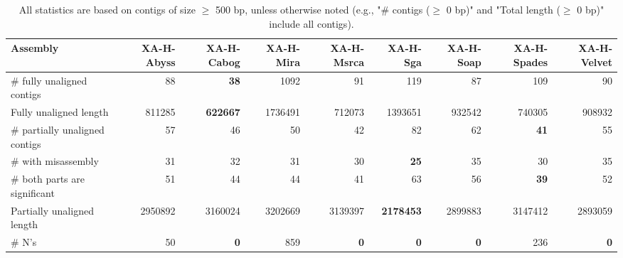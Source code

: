 \documentclass[12pt,a4paper]{article}
\begin{document}
\begin{table}[ht]
\begin{center}
\caption{All statistics are based on contigs of size $\geq$ 500 bp, unless otherwise noted (e.g., "\# contigs ($\geq$ 0 bp)" and "Total length ($\geq$ 0 bp)" include all contigs).}
\begin{tabular}{|l*{8}{|r}|}
\hline
Assembly & XA-H-Abyss & XA-H-Cabog & XA-H-Mira & XA-H-Msrca & XA-H-Sga & XA-H-Soap & XA-H-Spades & XA-H-Velvet \\ \hline
\# fully unaligned contigs & 88 & {\bf 38} & 1092 & 91 & 119 & 87 & 109 & 90 \\ \hline
Fully unaligned length & 811285 & {\bf 622667} & 1736491 & 712073 & 1393651 & 932542 & 740305 & 908932 \\ \hline
\# partially unaligned contigs & 57 & 46 & 50 & 42 & 82 & 62 & {\bf 41} & 55 \\ \hline
\hspace{5mm}\# with misassembly & 31 & 32 & 31 & 30 & {\bf 25} & 35 & 30 & 35 \\ \hline
\hspace{5mm}\# both parts are significant & 51 & 44 & 44 & 41 & 63 & 56 & {\bf 39} & 52 \\ \hline
Partially unaligned length & 2950892 & 3160024 & 3202669 & 3139397 & {\bf 2178453} & 2899883 & 3147412 & 2893059 \\ \hline
\# N's & 50 & {\bf 0} & 859 & {\bf 0} & {\bf 0} & {\bf 0} & 236 & {\bf 0} \\ \hline
\end{tabular}
\end{center}
\end{table}
\end{document}
